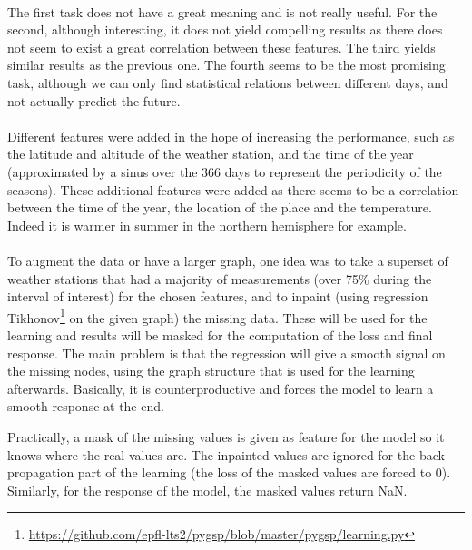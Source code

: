 \documentclass[11pt]{report}
\begin{document}
\paragraph*{}
The first task does not have a great meaning and is not really useful. For the second, although interesting, it does not yield compelling results as there does not seem to exist a great correlation between these features.
The third yields similar results as the previous one. The fourth seems to be the most promising task, although we can only find statistical relations between different days, and not actually predict the future.

\paragraph*{}
Different features were added in the hope of increasing the performance, such as the latitude and altitude of the weather station, and the time of the year (approximated by a sinus over the 366 days to represent the periodicity of the seasons). These additional features were added as there seems to be a correlation between the time of the year, the location of the place and the temperature. Indeed it is warmer in summer in the northern hemisphere for example.

\paragraph*{}
To augment the data or have a larger graph, one idea was to take a superset of weather stations that had a majority of measurements (over 75\%  during the interval of interest) for the chosen features, and to inpaint (using regression Tikhonov\footnote{\url{https://github.com/epfl-lts2/pygsp/blob/master/pygsp/learning.py}} on the given graph) the missing data. These will be used for the learning and results will be masked for the computation of the loss and final response. The main problem is that the regression will give a smooth signal on the missing nodes, using the graph structure that is used for the learning afterwards. Basically, it is counterproductive and forces the model to learn a smooth response at the end.

Practically, a mask of the missing values is given as feature for the model so it knows where the real values are. The inpainted values are ignored for the back-propagation part of the learning (the loss of the masked values are forced to 0). Similarly, for the response of the model, the masked values return NaN.
\end{document}
